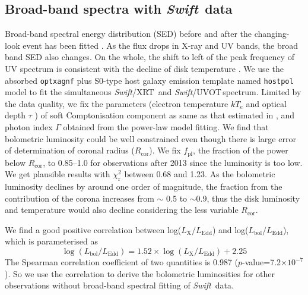 \documentclass[twocolumn]{aastex63}
\newcommand{\swift}{{\small \it Swift}}
\newcommand{\xrt}{{\small {\it Swift}/XRT}}
\newcommand{\uvot}{{\small {\it Swift}/UVOT}}
\begin{document}
\subsection{Broad-band spectra with \swift\, data}
\label{swift-sed}
Broad-band spectral energy distribution (SED) before and after the changing-look event has been fitted \citep[see][]{2016A&A...593L...9H,2018MNRAS.480.3898N}. As the flux drops in X-ray and UV bands, the broad band SED also changes. On the whole, the shift to left of the peak frequency of UV spectrum is consistent with the decline of disk temperature \citep[also described in][]{2016A&A...593L...9H}. We use the absorbed \texttt{optxagnf} plus S0-type host galaxy emission template named \texttt{hostpol} \citep{2007ApJ...663...81P} model to fit the simultaneous \xrt\, and \uvot \,spectrum. Limited by the data quality, we fix the parameters (electron temperature $kT_e$  and optical depth $\tau$ ) of soft Comptonisation component as same as that estimated in \citet{2018MNRAS.480.3898N}, and photon index $\Gamma$ obtained from the power-law model fitting. We find that bolometric luminosity could be well constrained even though there is large error of determination of coronal radius ($R_\mathrm{cor}$). We fix $f_\mathrm{pl}$, the fraction of the power below $R_\mathrm{cor}$, to 0.85--1.0 \citep[see also][]{2018MNRAS.480.3898N} for observations after 2013 since the luminosity is too low. We get plausible results with $\chi^2_\mathrm{r}$ between 0.68 and 1.23. As the bolometric luminosity declines by around one order of magnitude, the fraction from the contribution of the corona increases from $\sim$ 0.5 to $\sim$0.9, thus the disk luminosity and temperature would also decline considering the less variable $R_\mathrm{cor}$. 

We find a good positive correlation between log($L_\mathrm{X}/L_\mathrm{Edd}$) and log($L_\mathrm{bol}/L_\mathrm{Edd}$), which is parameterised as 
\begin{equation}\label{Lbol-LX}
\log(L_\mathrm{bol}/L_\mathrm{Edd})= 1.52 \times \log( L_\mathrm{X}/L_\mathrm{Edd})+2.25
\end{equation} 
 The Spearman correlation coefficient of two quantities is 0.987 ($p$-value=7.2$\times10^{-7}$). So we use the correlation to derive the bolometric luminosities for other observations without broad-band spectral fitting of \swift\, data. 
\end{document}
